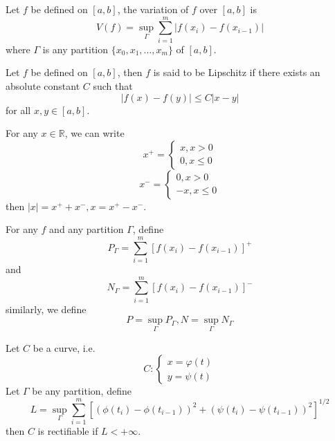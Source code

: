 \documentclass[openany]{book}
\newcommand{\R}{\mathbb{R}}
\begin{document}
\begin{defn}[variation]
    Let $f$ be defined on $[a,b]$, the variation of $f$ over $[a,b]$ is 
    \begin{equation*}
        V(f)=\sup_\Gamma\sum_{i=1}^m|f(x_i)-f(x_{i-1})|
    \end{equation*}
    where $\Gamma$ is any partition $\{x_0,x_1,\dots, x_m\}$ of $[a,b]$.
\end{defn}
\begin{defn}[Lipschitz]
    Let $f$ be defined on $[a,b]$, then $f$ is said to be Lipschitz if there exists an absolute constant $C$ such that 
    \begin{equation*}
        |f(x)-f(y)|\leq C|x-y|
    \end{equation*}
    for all $x,y\in [a,b]$.
\end{defn}
\begin{defn}[splitting]
    For any $x\in\R$, we can write 
    \begin{equation*}
        x^+=\begin{cases}
            x, x>0\\
            0, x\leq 0
        \end{cases}
    \end{equation*}
    \begin{equation*}
        x^-=\begin{cases}
            0, x>0\\
            -x, x\leq 0
        \end{cases}
    \end{equation*}
    then $|x|=x^{+}+x^{-}, x=x^{+}-x^{-}$.
\end{defn}
\begin{defn}
    For any $f$ and any partition $\Gamma$, define 
    \begin{equation*}
        P_\Gamma=\sum_{i=1}^m[f(x_i)-f(x_{i-1})]^+
    \end{equation*}
    and 
    \begin{equation*}
        N_\Gamma=\sum_{i=1}^m[f(x_i)-f(x_{i-1})]^-
    \end{equation*}
    similarly, we define 
    \begin{equation*}
        P=\sup_\Gamma P_\Gamma, N=\sup_\Gamma N_\Gamma
    \end{equation*}
\end{defn}
\begin{defn}
    Let $C$ be a curve, i.e. 
    \begin{equation*}
        C:\begin{cases}
            x=\varphi(t)\\
            y=\psi(t)
        \end{cases}
    \end{equation*}
    Let $\Gamma$ be any partition, define 
    \begin{equation*}
        L=\sup_\Gamma\sum_{i=1}^m\left[(\phi(t_i)-\phi(t_{i-1}))^2+(\psi(t_i)-\psi(t_{i-1}))^2\right]^{1/2}
    \end{equation*}
    then $C$ is rectifiable if $L<+\infty$.
\end{defn}
\end{document}
